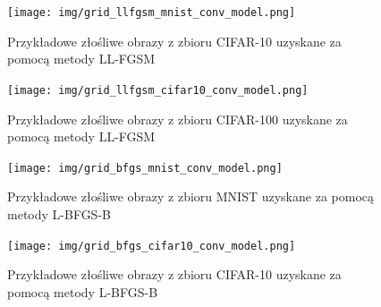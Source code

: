 \documentclass[
    left=2.5cm,         %
    right=2.5cm,        %
    top=2.5cm,          %
    bottom=3cm,         %
    bindingoffset=6mm,  %
    nohyphenation=false %
]{eiti/eiti-thesis}
\begin{document}
\begin{figure}[H]
    \centering
    \texttt{[image: img/grid\_llfgsm\_mnist\_conv\_model.png]}
    \caption{Przykładowe złośliwe obrazy z zbioru CIFAR-10 uzyskane za pomocą metody LL-FGSM}
    \label{fig:mnist_grid_llfgsm}
\end{figure}%

\begin{figure}[H]
    \centering
    \texttt{[image: img/grid\_llfgsm\_cifar10\_conv\_model.png]}
    \caption{Przykładowe złośliwe obrazy z zbioru CIFAR-100 uzyskane za pomocą metody LL-FGSM}
    \label{fig:cifar10_grid_llfgsm}
\end{figure}

\begin{figure}[H]
    \centering
    \texttt{[image: img/grid\_bfgs\_mnist\_conv\_model.png]}
    \caption{Przykładowe złośliwe obrazy z zbioru MNIST uzyskane za pomocą metody L-BFGS-B}
\end{figure}
\begin{figure}[H]
    \centering
    \texttt{[image: img/grid\_bfgs\_cifar10\_conv\_model.png]}
    \caption{Przykładowe złośliwe obrazy z zbioru CIFAR-10 uzyskane za pomocą metody L-BFGS-B}
\end{figure}
\end{document}
